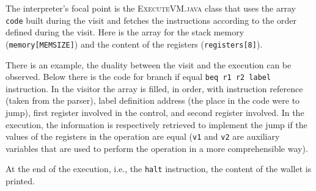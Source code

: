 \documentclass[11pt]{article} %
\begin{document}
\medskip

The interpreter's focal point is the \textsc{ExecuteVM.java} class that uses the array \verb|code| built during the visit and fetches the instructions according to the order defined during the visit. Here is the array for the stack memory (\verb|memory[MEMSIZE]|) and the content of the registers (\verb|registers[8]|).

\medskip

There is an example, the duality between the visit and the execution can be observed. Below there is the code for branch if equal \verb|beq r1 r2 label| instruction. In the visitor the array is filled, in order, with instruction reference (taken from the parser), label definition address (the place in the code were to jump), first register involved in the control, and second register involved. In the execution, the information is respectively retrieved to implement the jump if the values of the registers in the operation are equal (\verb|v1| and \verb|v2| are auxiliary variables that are used to perform the operation in a more comprehensible way).
 
 

\medskip

At the end of the execution, i.e., the \verb|halt| instruction, the content of the wallet is printed.
\end{document}
